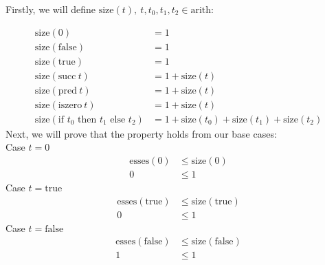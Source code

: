 \documentclass[letterpaper]{article}
\theoremstyle{plain}
\theoremstyle{definition}
\theoremstyle{remark}
\begin{document}
Firstly, we will define $\text{size}(t),~t,t_0,t_1,t_2\in\text{arith}$:

\begin{align*}
    \text{size}(0)&=1\\
    \text{size}(\text{false})&=1\\
    \text{size}(\text{true})&=1\\
    \text{size}(\text{succ}~t)&=1+\text{size}(t)\\
    \text{size}(\text{pred}~t)&=1+\text{size}(t)\\
    \text{size}(\text{iszero}~t)&=1+\text{size}(t)\\
    \text{size}(\text{if $t_0$ then $t_1$ else $t_2$})&=1+\text{size}(t_0)+\text{size}(t_1)+\text{size}(t_2)
\end{align*}
Next, we will prove that the property holds from our base cases:\\[1em]
Case $t=0$
\begin{align*}
    \text{esses}(0)&\leq\text{size}(0)\\
    0&\leq1
\end{align*}
Case $t=\text{true}$
\begin{align*}
    \text{esses}(\text{true})&\leq\text{size}(\text{true})\\
    0&\leq1
\end{align*}
Case $t=\text{false}$
\begin{align*}
    \text{esses}(\text{false})&\leq\text{size}(\text{false})\\
    1&\leq1
\end{align*}
\end{document}
